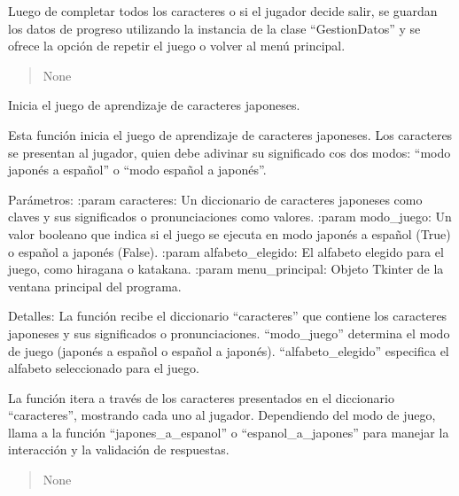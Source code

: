 \documentclass[letterpaper,10pt,spanish]{sphinxmanual}
\begin{document}
\begin{fulllineitems}
\begin{fulllineitems}
\sphinxAtStartPar
Luego de completar todos los caracteres o si el jugador decide salir, se guardan los datos de progreso
utilizando la instancia de la clase “GestionDatos” y se ofrece la opción de repetir el juego o volver al menú
principal.
\begin{quote}\begin{description}
\sphinxAtStartPar
None

\end{description}\end{quote}

\end{fulllineitems}


\begin{fulllineitems}
\label{\detokenize{juego:juego.Juego.jugar}}
\pysigstartsignatures
{}
\pysigstopsignatures
\sphinxAtStartPar
Inicia el juego de aprendizaje de caracteres japoneses.

\sphinxAtStartPar
Esta función inicia el juego de aprendizaje de caracteres japoneses. Los caracteres se presentan al jugador,
quien debe adivinar su significado cos dos modos: “modo japonés a español” o “modo español a japonés”.

\sphinxAtStartPar
Parámetros:
:param caracteres: Un diccionario de caracteres japoneses como claves y sus significados o
pronunciaciones como valores.
:param modo\_juego: Un valor booleano que indica si el juego se ejecuta en modo
japonés a español (True) o español a japonés (False).
:param alfabeto\_elegido: El alfabeto elegido para el
juego, como hiragana o katakana.
:param menu\_principal: Objeto Tkinter de la ventana principal del programa.

\sphinxAtStartPar
Detalles:
La función recibe el diccionario “caracteres” que contiene los caracteres japoneses y sus
significados o pronunciaciones. “modo\_juego” determina el modo de juego (japonés a español o español a
japonés). “alfabeto\_elegido” especifica el alfabeto seleccionado para el juego.

\sphinxAtStartPar
La función itera a través de los caracteres presentados en el diccionario “caracteres”, mostrando cada uno al
jugador. Dependiendo del modo de juego, llama a la función “japones\_a\_espanol” o “espanol\_a\_japones” para
manejar la interacción y la validación de respuestas.
\begin{quote}\begin{description}
\sphinxAtStartPar
None


\end{description}
\end{quote}
\end{fulllineitems}
\end{fulllineitems}
\end{document}
